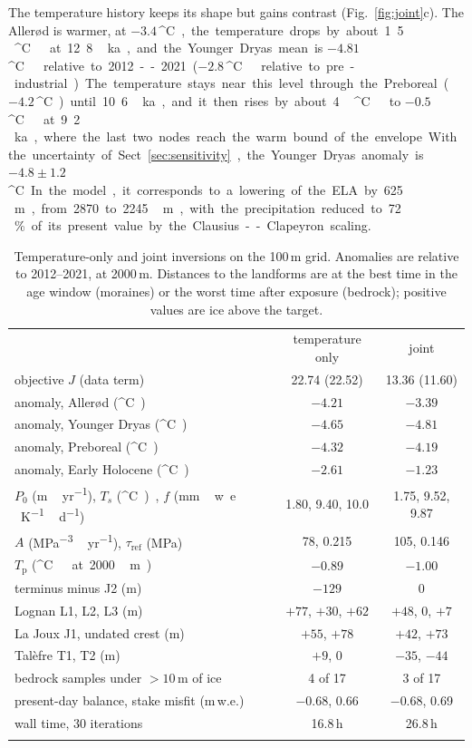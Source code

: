 \documentclass[tc, manuscript]{copernicus}
\newcommand{\degC}{\unit{^{\circ}C}}
\newcommand{\myr}{\unit{m\,yr^{-1}}}
\newcommand{\ddfunit}{\unit{mm\,w.e.\,K^{-1}\,d^{-1}}}
\newcommand{\Aunit}{\unit{MPa^{-3}\,yr^{-1}}}
\newcommand{\taur}{\tau_\mathrm{ref}}
\begin{document}
The temperature history keeps its shape but gains contrast (Fig.~\ref{fig:joint}c). The Aller\o d is warmer, at $-3.4$\,\degC, the temperature drops by about 1.5\,\degC\ at 12.8\,ka, and the Younger Dryas mean is $-4.81$\,\degC\ relative to 2012--2021 ($-2.8$\,\degC\ relative to pre-industrial). The temperature stays near this level through the Preboreal ($-4.2$\,\degC) until 10.6\,ka, and it then rises by about 4\,\degC\ to $-0.5$\,\degC\ at 9.2\,ka, where the last two nodes reach the warm bound of the envelope. With the uncertainty of Sect.~\ref{sec:sensitivity}, the Younger Dryas anomaly is $-4.8\pm1.2$\,\degC. In the model, it corresponds to a lowering of the ELA by 625\,m, from 2870 to 2245\,m, with the precipitation reduced to 72\,\% of its present value by the Clausius--Clapeyron scaling.

\begin{table}[t]
\caption{Temperature-only and joint inversions on the 100\,m grid. Anomalies are relative to 2012--2021, at 2000\,m. Distances to the landforms are at the best time in the age window (moraines) or the worst time after exposure (bedrock); positive values are ice above the target.}
\label{tab:results}
\begin{tabular}{lcc}
\tophline
 & temperature only & joint \\
\middlehline
objective $J$ (data term) & 22.74 (22.52) & 13.36 (11.60) \\
anomaly, Aller\o d (\degC) & $-4.21$ & $-3.39$ \\
anomaly, Younger Dryas (\degC) & $-4.65$ & $-4.81$ \\
anomaly, Preboreal (\degC) & $-4.32$ & $-4.19$ \\
anomaly, Early Holocene (\degC) & $-2.61$ & $-1.23$ \\
$P_0$ (\myr), $T_s$ (\degC), $f$ (\ddfunit) & 1.80, 9.40, 10.0 & 1.75, 9.52, 9.87 \\
$A$ (\Aunit), $\taur$ (MPa) & 78, 0.215 & 105, 0.146 \\
$T_\mathrm{p}$ (\degC\ at 2000\,m) & $-0.89$ & $-1.00$ \\
terminus minus J2 (m) & $-129$ & $0$ \\
Lognan L1, L2, L3 (m) & $+77$, $+30$, $+62$ & $+48$, $0$, $+7$ \\
La Joux J1, undated crest (m) & $+55$, $+78$ & $+42$, $+73$ \\
Tal\`efre T1, T2 (m) & $+9$, $0$ & $-35$, $-44$ \\
bedrock samples under $>10$\,m of ice & 4 of 17 & 3 of 17 \\
present-day balance, stake misfit (m\,w.e.) & $-0.68$, 0.66 & $-0.68$, 0.69 \\
wall time, 30 iterations & 16.8\,h & 26.8\,h \\
\bottomhline
\end{tabular}
\end{table}
\end{document}
